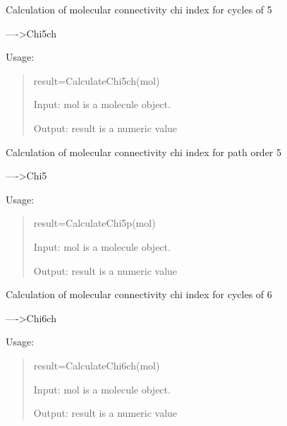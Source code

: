 \documentclass[letterpaper,10pt,english]{sphinxmanual}
\begin{document}

\begin{fulllineitems}
\label{reference/connectivity:connectivity.CalculateChi5ch}
Calculation of molecular connectivity chi index for cycles of 5

----\textgreater{}Chi5ch

Usage:
\begin{quote}

result=CalculateChi5ch(mol)

Input: mol is a molecule object.

Output: result is a numeric value
\end{quote}

\end{fulllineitems}


\begin{fulllineitems}
\label{reference/connectivity:connectivity.CalculateChi5p}
Calculation of molecular connectivity chi index for path order 5

----\textgreater{}Chi5

Usage:
\begin{quote}

result=CalculateChi5p(mol)

Input: mol is a molecule object.

Output: result is a numeric value
\end{quote}

\end{fulllineitems}


\begin{fulllineitems}
\label{reference/connectivity:connectivity.CalculateChi6ch}
Calculation of molecular connectivity chi index for cycles of 6

----\textgreater{}Chi6ch

Usage:
\begin{quote}

result=CalculateChi6ch(mol)

Input: mol is a molecule object.

Output: result is a numeric value
\end{quote}

\end{fulllineitems}
\end{document}
